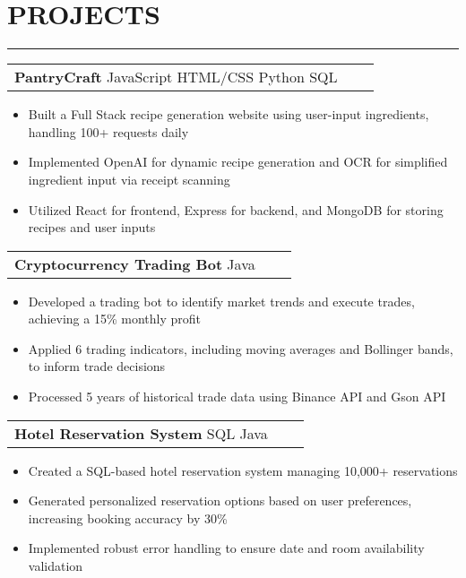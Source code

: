 \documentclass[a4paper,10pt]{article}
\begin{document}
\section*{\large PROJECTS}
\vspace{-18pt}
\noindent\rule{\textwidth}{0.4pt}
\vspace{5pt}
\begin{tabularx}{\textwidth}{@{}lXr@{}}
\textbf{PantryCraft} \textbar{} JavaScript \textbar{} HTML/CSS \textbar{} Python \textbar{} SQL \\
\end{tabularx}
\begin{itemize}[leftmargin=*,label=\textbullet]
  \item Built a Full Stack recipe generation website using user-input ingredients, handling 100+ requests daily
  \item Implemented OpenAI for dynamic recipe generation and OCR for simplified ingredient input via receipt scanning
  \item Utilized React for frontend, Express for backend, and MongoDB for storing recipes and user inputs
\end{itemize}
\vspace{10pt}
\begin{tabularx}{\textwidth}{@{}lXr@{}}
\textbf{Cryptocurrency Trading Bot} \textbar{} Java \\
\end{tabularx}
\begin{itemize}[leftmargin=*,label=\textbullet]
  \item Developed a trading bot to identify market trends and execute trades, achieving a 15\% monthly profit
  \item Applied 6 trading indicators, including moving averages and Bollinger bands, to inform trade decisions
  \item Processed 5 years of historical trade data using Binance API and Gson API
\end{itemize}
\vspace{10pt}
\begin{tabularx}{\textwidth}{@{}lXr@{}}
\textbf{Hotel Reservation System} \textbar{} SQL \textbar{} Java \\
\end{tabularx}
\begin{itemize}[leftmargin=*,label=\textbullet]
  \item Created a SQL-based hotel reservation system managing 10,000+ reservations
  \item Generated personalized reservation options based on user preferences, increasing booking accuracy by 30\%
  \item Implemented robust error handling to ensure date and room availability validation
\end{itemize}
\end{document}
